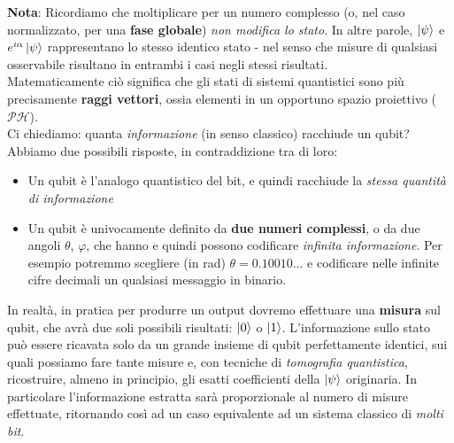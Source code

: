 \documentclass[../../InformazioneQuantistica.tex]{subfiles}
\begin{document}
\begin{comment}
\section{Qubit}
\lesson{2 \bluedot}{28/2/2019}
\textbf{Riepilogando}, abbiamo sostituito lo \textit{stato classico} di un bit con uno \textit{stato quantistico}, dato da un \textbf{qubit}\index{Qubit}, costituito da una combinazione lineare di due stati fondamentali $\ket{0}$ e $\ket{1}$:
\begin{align*}
\ket{\psi} = \cos\frac{\theta}{2} \ket{0} + e^{i\varphi} \sin\frac{\theta}{2}\ket{1}
\end{align*}
\end{comment}

\textbf{Nota}: Ricordiamo che moltiplicare per un numero complesso (o, nel caso normalizzato, per una \textbf{fase globale}) \textit{non modifica lo stato}. In altre parole, $\Ket{\psi}$ e $e^{i\alpha}\Ket{\psi}$ rappresentano lo stesso identico stato - nel senso che misure di qualsiasi osservabile risultano in entrambi i casi negli stessi risultati.\\
Matematicamente ciò significa che gli stati di sistemi quantistici sono più precisamente \textbf{raggi vettori}, ossia elementi in un opportuno spazio proiettivo ($\mathcal{PH}$).\\

Ci chiediamo: quanta \textit{informazione} (in senso classico) racchiude un qubit? Abbiamo due possibili risposte, in contraddizione tra di loro:
\begin{itemize}
\item Un qubit è l'analogo quantistico del bit, e quindi racchiude la \textit{stessa quantità di informazione}
\item Un qubit è univocamente definito da \textbf{due numeri complessi}, o da due angoli $\theta$, $\varphi$, che hanno  e quindi possono codificare \textit{infinita informazione}. Per esempio potremmo scegliere (in \si{\radian}) $\theta=0.10010\dots$ e codificare nelle infinite cifre decimali un qualsiasi messaggio in binario.
\end{itemize}
In realtà, in pratica per produrre un output dovremo effettuare una \textbf{misura} sul qubit, che avrà due soli possibili risultati: $\Ket{0}$ o $\Ket{1}$. L'informazione sullo stato può essere ricavata solo da un grande insieme di qubit perfettamente identici, sui quali possiamo fare tante misure e, con tecniche di \textit{tomografia quantistica}, ricostruire, almeno in principio, gli esatti coefficienti della $\Ket{\psi}$ originaria. In particolare l'informazione estratta sarà proporzionale al numero di misure effettuate, ritornando così ad un caso equivalente ad un sistema classico di \textit{molti bit}.\\
\end{document}

